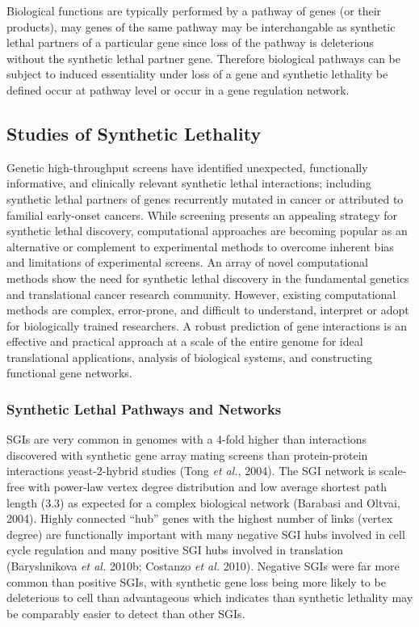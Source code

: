 Biological functions are typically performed by a pathway of genes (or their products), may genes of the same pathway may be interchangable as synthetic lethal partners of a particular gene since loss of the pathway is deleterious without the synthetic lethal partner gene. Therefore biological pathways can be subject to induced essentiality under loss of a gene and synthetic lethality be defined occur at pathway level or occur in a gene regulation network. 

\subsection{Studies of Synthetic Lethality}
Genetic high-throughput screens have identified unexpected, functionally informative, and clinically relevant synthetic lethal interactions; including synthetic lethal partners of genes recurrently mutated in cancer or attributed to familial early-onset cancers. While screening presents an appealing strategy for synthetic lethal discovery, computational approaches are becoming popular as an alternative or complement to experimental methods to overcome inherent bias and limitations of experimental screens. An array of novel computational methods show the need for synthetic lethal discovery in the fundamental genetics and translational cancer research community. However, existing computational methods are complex, error-prone, and difficult to understand, interpret or adopt for biologically trained researchers. A robust prediction of gene interactions is an effective and practical approach at a scale of the entire genome for ideal translational applications, analysis of biological systems, and constructing functional gene networks.

\subsubsection{Synthetic Lethal Pathways and Networks}
SGIs are very common in genomes with a 4-fold higher than interactions discovered with synthetic gene array mating screens than protein-protein interactions yeast-2-hybrid studies (Tong\textit{ et al.}, 2004). The SGI network is scale-free with power-law vertex degree distribution and low average shortest path length (3.3) as expected for a complex biological network (Barabasi and Oltvai, 2004). Highly connected ``hub'' genes with the highest number of links (vertex degree) are functionally important with many negative SGI hubs involved in cell cycle regulation and many positive SGI hubs involved in translation (Baryshnikova\textit{ et al.} 2010b; Costanzo\textit{ et al.} 2010). Negative SGIs were far more common than positive SGIs, with synthetic gene loss being more likely to be deleterious to cell than advantageous which indicates than synthetic lethality may be comparably easier to detect than other SGIs. 


